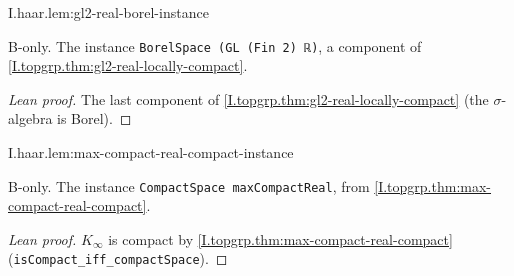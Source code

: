 \begin{lemma}
\bonly
{}
\end{lemma}
\begin{tfformal}{I.haar.lem:gl2-real-borel-instance}
\begin{tffidelity}
B-only. The instance \texttt{BorelSpace (GL (Fin 2) ℝ)}, a component of \cref{I.topgrp.thm:gl2-real-locally-compact}.
\end{tffidelity}
\end{tfformal}
\begin{proof}[Lean proof]
The last component of \cref{I.topgrp.thm:gl2-real-locally-compact} (the $\sigma$-algebra is Borel).
\end{proof}

\begin{lemma}
\bonly
{}
\end{lemma}
\begin{tfformal}{I.haar.lem:max-compact-real-compact-instance}
\begin{tffidelity}
B-only. The instance \texttt{CompactSpace maxCompactReal}, from \cref{I.topgrp.thm:max-compact-real-compact}.
\end{tffidelity}
\end{tfformal}
\begin{proof}[Lean proof]
$K_\infty$ is compact by \cref{I.topgrp.thm:max-compact-real-compact} (\texttt{isCompact\_iff\_compactSpace}).
\end{proof}

